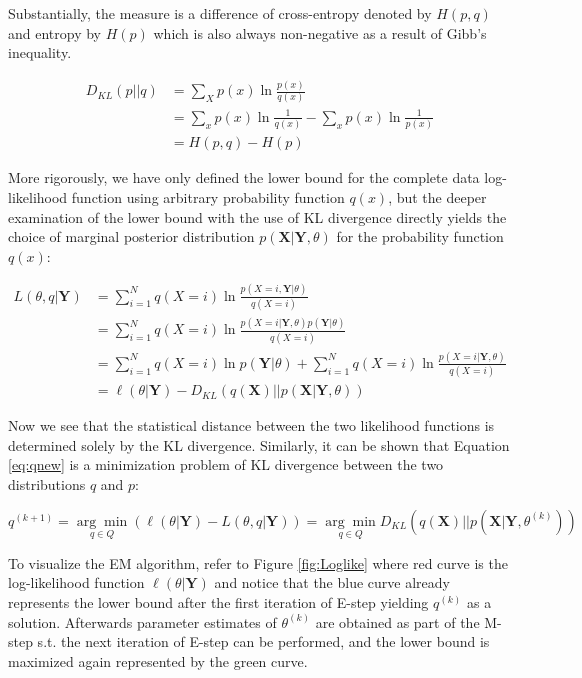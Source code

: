 Substantially, the measure is a difference of cross-entropy denoted by $H(p,q)$ and entropy by $H(p)$ which is also always non-negative as a result of Gibb's inequality.

\begin{align}
    D_{KL} (p || q) & = \sum_{X} p(x) \ln \frac{p(x)}{q(x)} \\
                    & = \sum_{x} p(x) \ln \frac{1}{q(x)} - \sum_{x} p(x) \ln \frac{1}{p(x)} \\
                    & = H(p,q) - H(p)
\end{align}

More rigorously, we have only defined the lower bound for the complete data log-likelihood function using arbitrary probability function $q(x)$, 
but the deeper examination of the lower bound with the use of KL divergence directly yields the choice of marginal posterior 
distribution $p(\textbf{X}|\textbf{Y},\theta)$ for the probability function $q(x)$:

\begin{align}
    L(\theta,q|\textbf{Y}) &= \sum_{i=1}^{N} q(X = i) \ln \frac{p(X = i,\textbf{Y}|\theta)}{q(X = i)} \\
    & = \sum_{i=1}^{N} q(X = i) \ln \frac{p(X = i|\textbf{Y},\theta) p(\textbf{Y}| \theta)}{q(X = i)} \\
    & = \sum_{i=1}^{N} q(X = i) \ln p(\textbf{Y}|\theta) + \sum_{i=1}^{N} q(X = i) \ln \frac{p(X = i|\textbf{Y},\theta)}{q(X = i)} \\
    & =  \ell(\theta|\textbf{Y}) - D_{KL}(q(\textbf{X})||p(\textbf{X}|\textbf{Y},\theta))
\end{align}

Now we see that the statistical distance between the two likelihood functions is determined solely by the KL divergence. Similarly, it can be shown that Equation \ref{eq:qnew} is a 
minimization problem of KL divergence between the two distributions $q$ and $p$:

\begin{equation}
    q^{(k+1)} = \underset{q \in Q}{\arg\min}(\ell(\theta|\textbf{Y}) - L(\theta, q|\textbf{Y})) = \underset{q \in Q}{\arg\min}  D_{KL} (q(\textbf{X}) || p(\textbf{X}| \textbf{Y},\theta^{(k)}))
\end{equation}

To visualize the EM algorithm, refer to Figure \ref{fig:Loglike} where red curve is the log-likelihood function $\ell(\theta|\textbf{Y})$
and notice that the blue curve already represents the lower bound
after the first iteration of E-step yielding $q^{(k)}$ as a solution. Afterwards parameter estimates of $\theta^{(k)}$ are obtained as part of the M-step 
s.t. the next iteration of E-step can be performed, and the lower bound is maximized again represented by the green curve.


